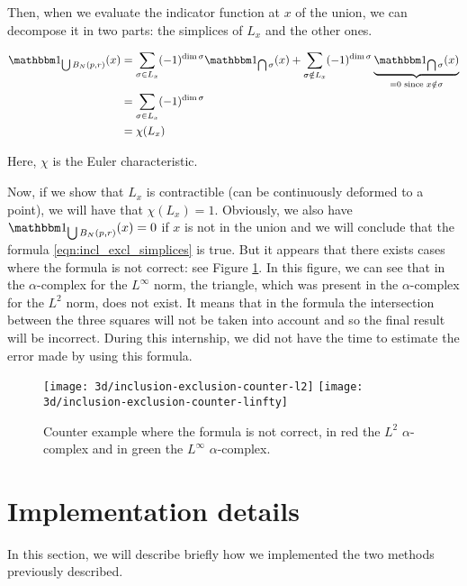 Then, when we evaluate the indicator function at $ x $ of the union, we can
decompose it in two parts: the simplices of $ L_x $ and the other ones.

\begin{align*}
    \indicator{\bigcup B_N(p, r)}(x) &= \sum_{\sigma \in L_x} (-1)^{\dim \sigma}
    \indicator{\bigcap \sigma}(x) + \sum_{\sigma \notin L_x} (-1)^{\dim \sigma}
    \underbrace{\indicator{\bigcap \sigma}(x)}_{= 0 \text{ since } x \notin
        \sigma} \\
    &= \sum_{\sigma \in L_x} (-1)^{\dim \sigma} \\
    &= \chi(L_x)
\end{align*}

Here, $ \chi $ is the Euler characteristic.

Now, if we show that $ L_x $ is contractible (can be continuously deformed to a
point), we will have that $ \chi(L_x) = 1 $. Obviously, we also have $
\indicator{\bigcup B_N(p, r)}(x) = 0 $ if $ x $ is not in the union and we will
conclude that the formula \ref{eqn:incl_excl_simplices} is true. But it appears
that there exists cases where the formula is not correct: see Figure
\ref{fig:incl_excl-examples}. In this figure, we can see that in the
$\alpha$-complex for the $ L^\infty $ norm, the triangle, which was present in
the $\alpha$-complex for the $ L^2 $ norm, does not exist. It means that in the
formula the intersection between the three squares will not be taken into
account and so the final result will be incorrect. During this internship, we
did not have the time to estimate the error made by using this formula.

\begin{figure}[h]
    \centering
    \texttt{[image: 3d/inclusion-exclusion-counter-l2]}
    \hspace{2cm}
    \texttt{[image: 3d/inclusion-exclusion-counter-linfty]}
    \caption{Counter example where the formula is not correct, in red the
        $ L^2$ $\alpha$-complex and in green the $ L^\infty$ $\alpha$-complex.}
    \label{fig:incl_excl-examples}
\end{figure}

\section{Implementation details}
\label{sec:3d-implementation}

In this section, we will describe briefly how we implemented the two methods
previously described.

